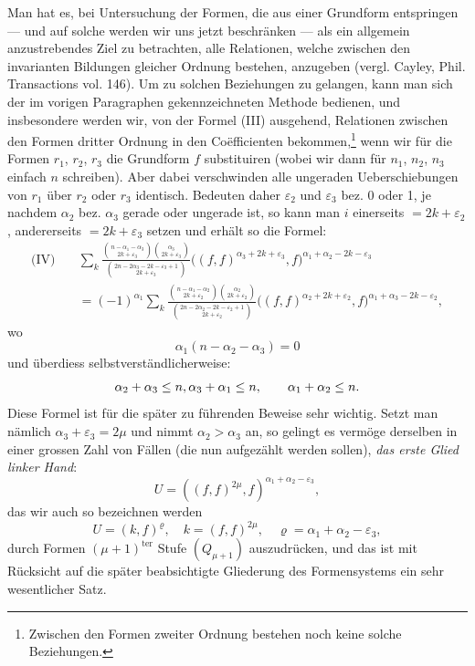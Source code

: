 \documentclass[10pt]{article}
\begin{document}
Man hat es, bei Untersuchung der Formen, die aus einer Grundform entspringen --- und auf solche werden wir uns jetzt beschränken --- als ein allgemein anzustrebendes Ziel zu betrachten, alle Relationen, welche zwischen den invarianten Bildungen gleicher Ordnung bestehen, anzugeben (vergl. Cayley, Phil. Transactions vol. 146). Um zu solchen Beziehungen zu gelangen, kann man sich der im vorigen Paragraphen gekennzeichneten Methode bedienen, und insbesondere werden wir, von der Formel (III) ausgehend, Relationen zwischen den Formen dritter Ordnung in den Coëfficienten bekommen,\footnote{Zwischen den Formen zweiter Ordnung bestehen noch keine solche Beziehungen.} wenn wir für die Formen $r_1$, $r_2$, $r_3$ die Grundform $f$ substituiren (wobei wir dann für $n_1$, $n_2$, $n_3$ einfach $n$ schreiben). Aber dabei verschwinden alle ungeraden Ueberschiebungen von $r_1$ über $r_2$ oder $r_3$ identisch. Bedeuten daher $\varepsilon_2$ und $\varepsilon_3$ bez. 0 oder 1, je nachdem $\alpha_2$ bez. $\alpha_3$ gerade oder ungerade ist, so kann man $i$ einerseits $=2k+\varepsilon_2$, andererseits $=2k+\varepsilon_3$ setzen und erhält so die Formel:
\[
\begin{aligned}
\text{(IV)}\quad
&\sum_k\frac{\binom{n-\alpha_1-\alpha_3}{2k+\varepsilon_3}\binom{\alpha_3}{2k+\varepsilon_3}}{\binom{2n-2\alpha_3-2k-\varepsilon_3+1}{2k+\varepsilon_3}}\bigl((f,f)^{\alpha_3+2k+\varepsilon_3},f\bigr)^{\alpha_1+\alpha_2-2k-\varepsilon_3}\\
&=(-1)^{\alpha_1}\sum_k\frac{\binom{n-\alpha_1-\alpha_2}{2k+\varepsilon_2}\binom{\alpha_2}{2k+\varepsilon_2}}{\binom{2n-2\alpha_2-2k-\varepsilon_2+1}{2k+\varepsilon_2}}\bigl((f,f)^{\alpha_2+2k+\varepsilon_2},f\bigr)^{\alpha_1+\alpha_3-2k-\varepsilon_2},
\end{aligned}
\]
wo
\[
\alpha_1(n-\alpha_2-\alpha_3)=0
\]
und überdiess selbstverständlicherweise:
\[
\alpha_2+\alpha_3\leq n,\\ \alpha_3+\alpha_1\leq n,\qquad \alpha_1+\alpha_2\leq n.
\]
Diese Formel ist für die später zu führenden Beweise sehr wichtig. Setzt man nämlich $\alpha_3+\varepsilon_3=2\mu$ und nimmt $\alpha_2>\alpha_3$ an, so gelingt es vermöge derselben in einer grossen Zahl von Fällen (die nun aufgezählt werden sollen), \emph{das erste Glied linker Hand}:
\[
U=((f,f)^{2\mu},f)^{\alpha_1+\alpha_2-\varepsilon_3},
\]
das wir auch so bezeichnen werden
\[
U=(k,f)^\varrho,\quad k=(f,f)^{2\mu},\quad \varrho=\alpha_1+\alpha_2-\varepsilon_3,
\]
durch Formen $(\mu+1)^{\mathrm{ter}}$ Stufe $(Q_{\mu+1})$ auszudrücken, und das ist mit Rücksicht auf die später beabsichtigte Gliederung des Formensystems ein sehr wesentlicher Satz.
\end{document}
